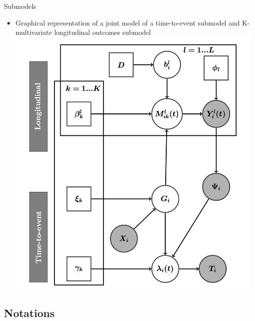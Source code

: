 \documentclass{beamer}
\begin{document}
\begin{frame}{Submodels}
\begin{itemize}
\item Graphical representation of a joint model of a time-to-event submodel and K-multivariate longitudinal outcomes submodel
\includegraphics[scale=0.29]{figures/lights_graphical_representation.png}
\end{itemize}
\end{frame}
\subsection{Notations}
\end{document}
